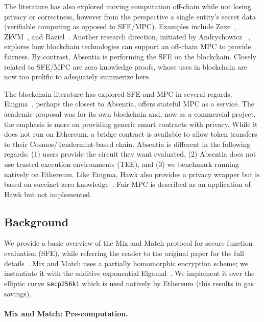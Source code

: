 
The literature has also explored moving computation off-chain while not losing privacy or correctness, however from the perspective a single entity's secret data (\ie verifiable computing as opposed to SFE/MPC). Examples include Zexe~\cite{bowe2020zexe}, ZkVM~\cite{zkvm}, and Raziel~\cite{sanchez2018raziel}. Another research direction, initiated by Andrychowicz \etal~\cite{andrychowicz2014secure}, explores how blockchain technologies can support an off-chain MPC to provide fairness. By contrast, Absentia is performing the SFE on the blockchain. Closely related to SFE/MPC are zero knowledge proofs, whose uses in blockchain are now too prolific to adequately summerize here.

The blockchain literature has explored SFE and MPC in several regards. Enigma~\cite{zyskind2015enigma}, perhaps the closest to Absentia, offers stateful MPC as a service. The academic proposal was for its own blockchain and, now as a commercial project, the emphasis is more on providing generic smart contracts with privacy. While it does not run on Ethereum, a bridge contract is available to allow token transfers to their Cosmos/Tendermint-based chain. Absentia is different in the following regards: (1) users provide the circuit they want evaluated, (2) Absentia does not use trusted execution environments (TEE), and (3) we benchmark running natively on Ethereum. Like Enigma, Hawk also provides a privacy wrapper but is based on succinct zero knowledge~\cite{kosba2016hawk}. Fair MPC is described as an application of Hawk but not implemented.  



\subsection{Background}

We provide a basic overview of the Mix and Match protocol for secure function evaluation (SFE), while referring the reader to the original paper for the full details~\cite{JJ00}. Mix and Match uses a partially homomorphic encryption scheme; we instantiate it with the additive exponential Elgamal~\cite{CGS97}. We implement it over the elliptic curve \texttt{secp256k1} which is used natively by Ethereum (this results in gas savings).

\paragraph{Mix and Match: Pre-computation.} 

